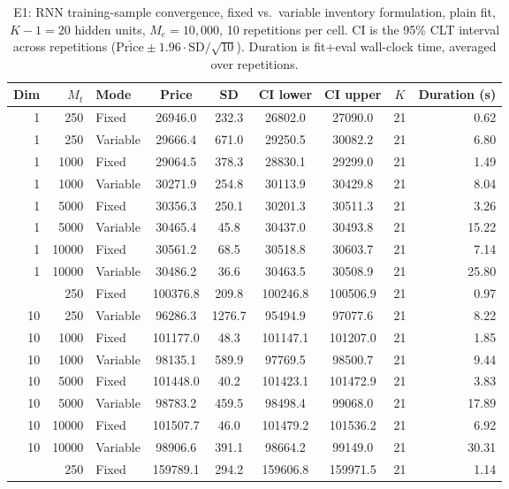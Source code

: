 \begin{table}

\caption{\label{tab:e1_inventory_mode_rnn}E1: RNN training-sample convergence, fixed vs.\ variable inventory formulation, plain fit, $K-1=20$ hidden units, $M_e=10{,}000$, 10 repetitions per cell. CI is the 95\% CLT interval across repetitions ($\bar{\text{Price}} \pm 1.96\cdot\text{SD}/\sqrt{10}$). Duration is fit+eval wall-clock time, averaged over repetitions.}
\footnotesize
\setlength{\tabcolsep}{4pt}
\centering
\begin{tabular}[t]{rrlcccccr}
\toprule
Dim & $M_t$ & Mode & Price & SD & CI lower & CI upper & $K$ & Duration (s)\\
\midrule
1 & 250 & Fixed & 26946.0 & 232.3 & 26802.0 & 27090.0 & 21 & 0.62\\
1 & 250 & Variable & 29666.4 & 671.0 & 29250.5 & 30082.2 & 21 & 6.80\\
1 & 1000 & Fixed & 29064.5 & 378.3 & 28830.1 & 29299.0 & 21 & 1.49\\
1 & 1000 & Variable & 30271.9 & 254.8 & 30113.9 & 30429.8 & 21 & 8.04\\
1 & 5000 & Fixed & 30356.3 & 250.1 & 30201.3 & 30511.3 & 21 & 3.26\\
1 & 5000 & Variable & 30465.4 & 45.8 & 30437.0 & 30493.8 & 21 & 15.22\\
1 & 10000 & Fixed & 30561.2 & 68.5 & 30518.8 & 30603.7 & 21 & 7.14\\
1 & 10000 & Variable & 30486.2 & 36.6 & 30463.5 & 30508.9 & 21 & 25.80\\
\addlinespace
10 & 250 & Fixed & 100376.8 & 209.8 & 100246.8 & 100506.9 & 21 & 0.97\\
10 & 250 & Variable & 96286.3 & 1276.7 & 95494.9 & 97077.6 & 21 & 8.22\\
10 & 1000 & Fixed & 101177.0 & 48.3 & 101147.1 & 101207.0 & 21 & 1.85\\
10 & 1000 & Variable & 98135.1 & 589.9 & 97769.5 & 98500.7 & 21 & 9.44\\
10 & 5000 & Fixed & 101448.0 & 40.2 & 101423.1 & 101472.9 & 21 & 3.83\\
10 & 5000 & Variable & 98783.2 & 459.5 & 98498.4 & 99068.0 & 21 & 17.89\\
10 & 10000 & Fixed & 101507.7 & 46.0 & 101479.2 & 101536.2 & 21 & 6.92\\
10 & 10000 & Variable & 98906.6 & 391.1 & 98664.2 & 99149.0 & 21 & 30.31\\
\addlinespace
25 & 250 & Fixed & 159789.1 & 294.2 & 159606.8 & 159971.5 & 21 & 1.14\\

\end{tabular}
\end{table}
